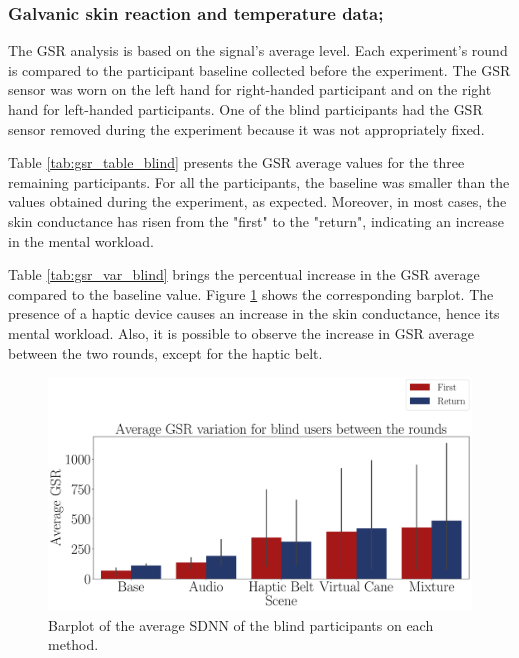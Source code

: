 \subsubsection{Galvanic skin reaction and temperature data;}
\label{subsubsec:results_gsr_temp_1}

The GSR analysis is based on the signal's average level. Each experiment's round is compared to the participant baseline collected before the experiment. The GSR sensor was worn on the left hand for right-handed participant and on the right hand for left-handed participants. One of the blind participants had the GSR sensor removed during the experiment because it was not appropriately fixed.

Table \ref{tab:gsr_table_blind} presents the GSR average values for the three remaining participants. For all the participants, the baseline was smaller than the values obtained during the experiment, as expected. Moreover, in most cases, the skin conductance has risen from the "first" to the "return", indicating an increase in the mental workload.



Table \ref{tab:gsr_var_blind} brings the percentual increase in the GSR average compared to the baseline value. Figure \ref{fig:barplot_gsr_avg_5_scene_blind} shows the corresponding barplot. The presence of a haptic device causes an increase in the skin conductance, hence its mental workload. Also, it is possible to observe the increase in GSR average between the two rounds, except for the haptic belt.



\begin{figure}[!htb]
    \centering
    \includegraphics[width = \textwidth]{Resultados/GSR/Figuras/pdf/barplot_gsr_avg_5_scene_blind.pdf}
    \caption{Barplot of the average SDNN of the blind participants on each method.}
    \label{fig:barplot_gsr_avg_5_scene_blind}
\end{figure}

